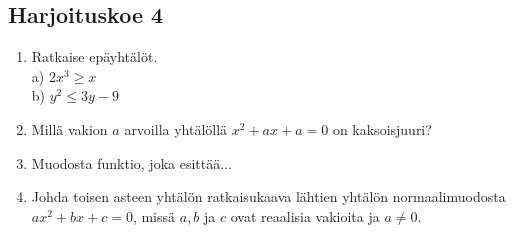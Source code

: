 \subsection*{Harjoituskoe 4}

\begin{enumerate}


\item Ratkaise epäyhtälöt. \\
a) $2x^3 \geq x$ \\
b) $y^2 \leq 3y -9 $

\item Millä vakion $a$ arvoilla yhtälöllä $x^2+ax+a=0$ on kaksoisjuuri?
\item Muodosta funktio, joka esittää...

\item Johda toisen asteen yhtälön ratkaisukaava lähtien yhtälön normaalimuodosta $ax^2+bx+c=0$, missä $a, b$ ja $c$ ovat reaalisia vakioita ja $a \neq 0$.
\end{enumerate}